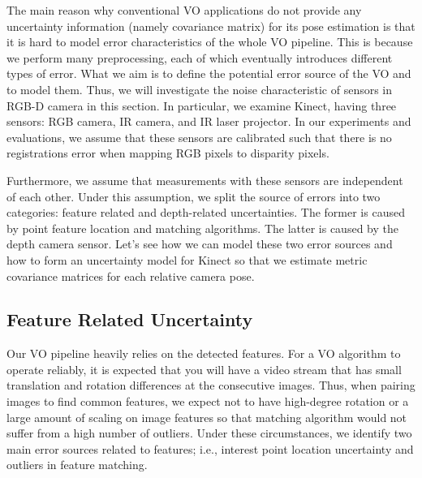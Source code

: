 \documentclass[12pt]{report}
\numberwithin{figure}{section}
\begin{document}
The main reason why conventional VO applications do not provide any uncertainty
information (namely covariance matrix) for its pose estimation is that it is
hard to model error characteristics of the whole VO pipeline.  This is because
we perform many preprocessing, each of which eventually introduces different
types of error. What we aim is to define the potential error source of the VO 
and
to model them. Thus, we will investigate the noise characteristic of sensors in
RGB-D camera in this section. In particular, we examine Kinect, having three
sensors: RGB camera, IR camera, and IR laser projector.  In our experiments and
evaluations, we assume that these sensors are calibrated such that there is no
registrations error when mapping RGB pixels to disparity pixels.

Furthermore, we assume that measurements with these sensors are independent of
each other.  Under this assumption, we split the source of errors into two
categories: feature related and depth-related uncertainties. The former is
caused by point feature location and matching algorithms. The latter is caused
by the depth camera sensor.  Let's see how we can model these two error sources
and how to form an uncertainty model for Kinect so that we estimate
metric covariance matrices for each relative camera pose.

\subsection{Feature Related Uncertainty} \label{sb_sc_pixel_uncertainty}

Our VO pipeline heavily relies on the detected features. For a VO algorithm to
operate reliably, it is expected that you will have a video stream that has
small translation and rotation differences at the consecutive images. Thus,
when pairing images to find common features, we expect not to have high-degree
rotation or a large amount of scaling on image features so that matching
algorithm would not suffer from a high number of outliers. Under these
circumstances, we identify two main error sources related to features; i.e.,
interest point location uncertainty and outliers in feature matching.
\end{document}
